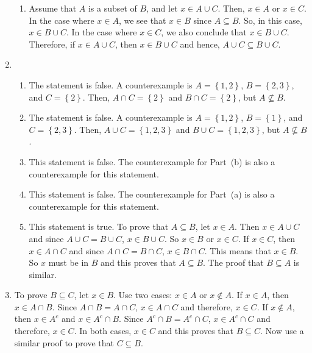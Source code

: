\begin{enumerate}
\begin{enumerate}
\item Assume that $A$ is a subset of $B$, and let $x \in A \cup C$.  Then, $x \in A$ or 
$x \in C$.  In the case where $x \in A$, we see that $x \in B$ since $A \subseteq B$.  So, in this case, $x \in B \cup C$.  In the case where $x \in C$, we also conclude that $x \in B \cup C$. Therefore, if $x \in A \cup C$, then $x \in B \cup C$ and hence, $A \cup C \subseteq B \cup C$.
\end {enumerate}


\item \begin{enumerate}
\item The statement is false.  A counterexample is $A = \left\{ 1, 2 \right\}$, 
$B = \left\{ 2, 3 \right\}$, and $C = \left\{ 2 \right\}$.  Then, $A \cap C = \left\{ 2 \right\}$ and $B \cap C = \left\{ 2 \right\}$, but $A \not\subseteq B$.

\item The statement is false.  A counterexample is $A = \left\{ 1, 2 \right\}$, 
$B = \left\{ 1 \right\}$, and $C = \left\{ 2, 3 \right\}$.  Then, 
$A \cup C = \left\{ 1, 2, 3 \right\}$ and $B \cup C = \left\{ 1, 2, 3 \right\}$, but 
$A \not\subseteq B$.

\item This statement is false.  The counterexample for Part~(b) is also a counterexample for this statement.

\item This statement is false.  The counterexample for Part~(a) is also a counterexample for this statement.

\item This statement is true.  To prove that $A \subseteq B$, let $x \in A$.  Then 
$x \in A \cup C$ and since $A \cup C = B \cup C$, $x \in B \cup C$.  So $x \in B$ or $x \in C$.  If $x \in C$, then $x \in A \cap C$ and since $A \cap C = B \cap C$, $x \in B \cap C$.  This means that $x \in B$.  So $x$ must be in $B$ and this proves that $A \subseteq B$.  The proof that $B \subseteq A$ is similar.
\end{enumerate}


\item To prove $B \subseteq C$, let $x \in B$.  Use two cases: $x \in A$ or $x \notin A$.  If $x \in A$, then $x \in A \cap B$.  Since $A \cap B = A \cap C$, $x \in A \cap C$ and therefore, $x \in C$.  If $x \notin A$, then $x \in A^c$ and $x \in A^c \cap B$.  Since 
$A^c \cap B = A^c \cap C$, $x \in A^c \cap C$ and therefore, $x \in C$.  In both cases, $x \in C$ and this proves that $B \subseteq C$.  Now use a similar proof to prove that $C \subseteq B$.



\end{enumerate}
